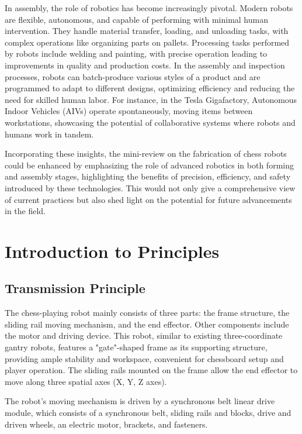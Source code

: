 \documentclass[10pt, a4paper, twocolumn]{article}
\begin{document}
In assembly, the role of robotics has become increasingly pivotal. Modern robots are flexible, autonomous, and capable of performing with minimal human intervention. They handle material transfer, loading, and unloading tasks, with complex operations like organizing parts on pallets. Processing tasks performed by robots include welding and painting, with precise operation leading to improvements in quality and production costs. In the assembly and inspection processes, robots can batch-produce various styles of a product and are programmed to adapt to different designs, optimizing efficiency and reducing the need for skilled human labor. For instance, in the Tesla Gigafactory, Autonomous Indoor Vehicles (AIVs) operate spontaneously, moving items between workstations, showcasing the potential of collaborative systems where robots and humans work in tandem\cite{RobotsNet2019}.

Incorporating these insights, the mini-review on the fabrication of chess robots could be enhanced by emphasizing the role of advanced robotics in both forming and assembly stages, highlighting the benefits of precision, efficiency, and safety introduced by these technologies. This would not only give a comprehensive view of current practices but also shed light on the potential for future advancements in the field.

\section{Introduction to Principles}
\subsection{Transmission Principle}
The chess-playing robot mainly consists of three parts: the frame structure, the sliding rail moving mechanism, and the end effector. Other components include the motor and driving device. This robot, similar to existing three-coordinate gantry robots, features a "gate"-shaped frame as its supporting structure, providing ample stability and workspace, convenient for chessboard setup and player operation. The sliding rails mounted on the frame allow the end effector to move along three spatial axes (X, Y, Z axes).

The robot's moving mechanism is driven by a synchronous belt linear drive module, which consists of a synchronous belt, sliding rails and blocks, drive and driven wheels, an electric motor, brackets, and fasteners. 
\end{document}
